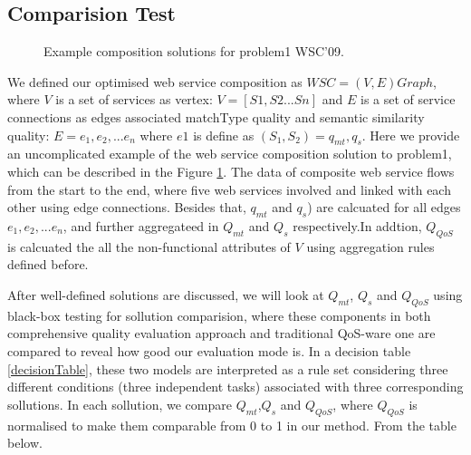 \documentclass{llncs}
\begin{document}
\subsection{Comparision Test}\label{comparisionTest}
\begin{figure}[h]
\centerline{
}
 \caption{Example composition solutions for problem1 WSC'09.}
 \label{wscs}
\end{figure}
We defined our optimised web service composition as $WSC = (V, E)Graph$, where $V$ is a set of services as vertex: $V=[S1, S2...Sn]$ and $E$ is a set of service connections as edges associated matchType quality and semantic similarity quality: $E = {e_{1}, e_{2},... e_{n}}$ where $e1$ is define as $(S_{1},S_{2})={q_{mt}, q_{s}}$. Here we provide an uncomplicated example of the web service composition solution to problem1, which can be described in the Figure \ref{wscs}. The data of composite web service flows from the start to the end, where five web services involved and linked with each other using edge connections. Besides that, $q_{mt}$ and $q_{s}$) are calcuated for all edges ${e_{1}, e_{2},... e_{n}}$, and further aggregateed in $Q_{mt}$ and $Q_{s}$ respectively.In addtion, $Q_{QoS}$ is calcuated the all the non-functional attributes of $V$ using aggregation rules defined before.

After well-defined solutions are discussed, we will look at $Q_{mt}$, $Q_{s}$ and $Q_{QoS}$ using  black-box testing for sollution comparision, where these components in both comprehensive quality evaluation approach and traditional QoS-ware one \cite{feng2013dynamic,huang2009effective,ma2015hybrid,da2014graph} are compared to reveal how good our evaluation mode is. In a decision table \ref{decisionTable}, these two models are interpreted as a rule set considering three different conditions (three independent tasks) associated with three corresponding sollutions. In each sollution, we compare $Q_{mt}$,$Q_{s}$ and $Q_{QoS}$, where $Q_{QoS}$ is normalised to make them comparable from 0 to 1 in our method. From the table below.
\end{document}

